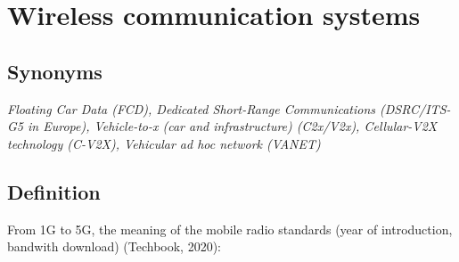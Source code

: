 \documentclass[
]{book}
\begin{document}
\hypertarget{wireless_com}{%
\section{Wireless communication systems}\label{wireless_com}}

\hypertarget{synonyms-38}{%
\subsection*{Synonyms}\label{synonyms-38}}

\emph{Floating Car Data (FCD), Dedicated Short-Range Communications (DSRC/ITS-G5 in Europe), Vehicle-to-x (car and infrastructure) (C2x/V2x), Cellular-V2X technology (C-V2X), Vehicular ad hoc network (VANET)}

\hypertarget{definition-41}{%
\subsection*{Definition}\label{definition-41}}

From 1G to 5G, the meaning of the mobile radio standards (year of introduction, bandwith download) (Techbook, 2020):
\end{document}
